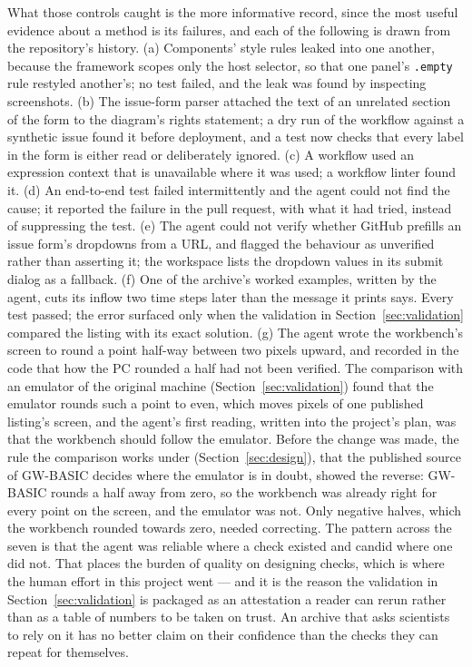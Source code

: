 What those controls caught is the more informative record, since the most useful evidence about a method is its failures, and each of the following is drawn from the repository's history. (a) Components' style rules leaked into one another, because the framework scopes only the host selector, so that one panel's \texttt{.empty} rule restyled another's; no test failed, and the leak was found by inspecting screenshots. (b) The issue-form parser attached the text of an unrelated section of the form to the diagram's rights statement; a dry run of the workflow against a synthetic issue found it before deployment, and a test now checks that every label in the form is either read or deliberately ignored. (c) A workflow used an expression context that is unavailable where it was used; a workflow linter found it. (d) An end-to-end test failed intermittently and the agent could not find the cause; it reported the failure in the pull request, with what it had tried, instead of suppressing the test. (e) The agent could not verify whether GitHub prefills an issue form's dropdowns from a URL, and flagged the behaviour as unverified rather than asserting it; the workspace lists the dropdown values in its submit dialog as a fallback. (f) One of the archive's worked examples, written by the agent, cuts its inflow two time steps later than the message it prints says. Every test passed; the error surfaced only when the validation in Section~\ref{sec:validation} compared the listing with its exact solution. (g) The agent wrote the workbench's screen to round a point half-way between two pixels upward, and recorded in the code that how the PC rounded a half had not been verified. The comparison with an emulator of the original machine (Section~\ref{sec:validation}) found that the emulator rounds such a point to even, which moves \oracleScreenDiffering{} pixels of one published listing's screen, and the agent's first reading, written into the project's plan, was that the workbench should follow the emulator. Before the change was made, the rule the comparison works under (Section~\ref{sec:design}), that the published source of GW-BASIC decides where the emulator is in doubt, showed the reverse: GW-BASIC rounds a half away from zero, so the workbench was already right for every point on the screen, and the emulator was not. Only negative halves, which the workbench rounded towards zero, needed correcting. The pattern across the seven is that the agent was reliable where a check existed and candid where one did not. That places the burden of quality on designing checks, which is where the human effort in this project went --- and it is the reason the validation in Section~\ref{sec:validation} is packaged as an attestation a reader can rerun rather than as a table of numbers to be taken on trust. An archive that asks scientists to rely on it has no better claim on their confidence than the checks they can repeat for themselves.

